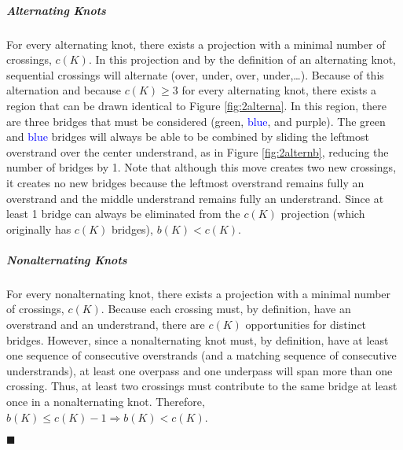 \documentclass[titlepage]{article}
\newcommand{\qed}{
    \begin{flushright}
        $\blacksquare$
    \end{flushright}
}
\begin{document}
\subparagraph{\textbf{Alternating Knots}} For every alternating knot, there exists a projection with a minimal number of crossings, $c(K)$. In this projection and by the definition of an alternating knot, sequential crossings will alternate (over, under, over, under,\dots). Because of this alternation and because $c(K)\geq 3$ for every alternating knot, there exists a region that can be drawn identical to Figure \ref{fig:2alterna}. In this region, there are three bridges that must be considered (\textcolor{grx}{green}, \textcolor{blue}{blue}, and \textcolor{pux}{purple}). The \textcolor{grx}{green} and \textcolor{blue}{blue} bridges will always be able to be combined by sliding the leftmost overstrand over the center understrand, as in Figure \ref{fig:2alternb}, reducing the number of bridges by 1. Note that although this move creates two new crossings, it creates no new bridges because the leftmost overstrand remains fully an overstrand and the middle understrand remains fully an understrand. Since at least 1 bridge can always be eliminated from the $c(K)$ projection (which originally has $c(K)$ bridges), $b(K)<c(K)$.
\subparagraph{\textbf{Nonalternating Knots}} For every nonalternating knot, there exists a projection with a minimal number of crossings, $c(K)$. Because each crossing must, by definition, have an overstrand and an understrand, there are $c(K)$ opportunities for distinct bridges. However, since a nonalternating knot must, by definition, have at least one sequence of consecutive overstrands (and a matching sequence of consecutive understrands), at least one overpass and one underpass will span more than one crossing. Thus, at least two crossings must contribute to the same bridge at least once in a nonalternating knot. Therefore, $b(K)\leq c(K)-1\Rightarrow b(K)<c(K)$.
\qed
\end{document}
